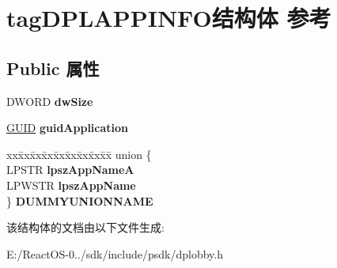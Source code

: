 \hypertarget{structtag_d_p_l_a_p_p_i_n_f_o}{}\section{tag\+D\+P\+L\+A\+P\+P\+I\+N\+F\+O结构体 参考}
\label{structtag_d_p_l_a_p_p_i_n_f_o}
\subsection*{Public 属性}
\begin{DoxyCompactItemize}
\item 
\mbox{\label{structtag_d_p_l_a_p_p_i_n_f_o_ac23be7863ad2269fc0937ca54dc6595c}} 
D\+W\+O\+RD {\bfseries dw\+Size}
\item 
\mbox{\label{structtag_d_p_l_a_p_p_i_n_f_o_a3ca617a479d534bd94e33fcc744182ee}} 
\hyperlink{interface_g_u_i_d}{G\+U\+ID} {\bfseries guid\+Application}
\item 
\mbox{\label{structtag_d_p_l_a_p_p_i_n_f_o_ac01619478b48d74893236b00127163c4}} 
\begin{tabbing}
xx\=xx\=xx\=xx\=xx\=xx\=xx\=xx\=xx\=\kill
union \{\\
\>LPSTR {\bfseries lpszAppNameA}\\
\>LPWSTR {\bfseries lpszAppName}\\
\} {\bfseries DUMMYUNIONNAME}\\

\end{tabbing}\end{DoxyCompactItemize}


该结构体的文档由以下文件生成\+:\begin{DoxyCompactItemize}
\item 
E\+:/\+React\+O\+S-\/0../sdk/include/psdk/dplobby.\+h\end{DoxyCompactItemize}

